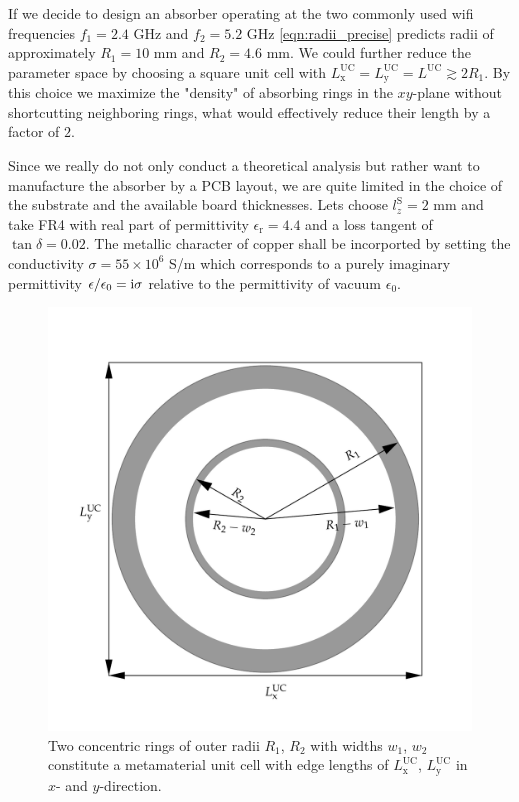 If we decide to design an absorber operating at the two commonly used wifi frequencies $f_1=2.4$ GHz and $f_2=5.2$ GHz \cref{eqn:radii_precise} predicts radii of approximately $R_1=10$ mm and $R_2=4.6$ mm. We could further reduce the parameter space by choosing a square unit cell with $L^\mathrm{UC}_\mathrm{x}=L^\mathrm{UC}_\mathrm{y}=L^\mathrm{UC}\gtrsim 2R_1$. By this choice we maximize the "density" of absorbing rings in the $xy$-plane without shortcutting neighboring rings, what would effectively reduce their length by a factor of $2$.

Since we really do not only conduct a theoretical analysis but rather want to manufacture the absorber by a PCB layout, we are quite limited in the choice of the substrate and the available board thicknesses. Lets choose $l_z^\mathrm{S}=2$ mm and take FR4 with real part of permittivity $\epsilon_\mathrm{r}=4.4$ and a loss tangent of $\tan \delta=0.02$. The metallic character of copper shall be incorported by setting the conductivity $\sigma=55\times 10^6$ S/m which corresponds to a purely imaginary permittivity $\epsilon/\epsilon_0 = \mathrm{i} \sigma$ relative to the permittivity of vacuum $\epsilon_0$.

\begin{figure}
\centering
\includegraphics[width=0.75\linewidth]{./media/double_ring_sketch.pdf}
\caption{Two concentric rings of outer radii $R_1$, $R_2$ with widths $w_1$, $w_2$ constitute a metamaterial unit cell with edge lengths of $L_\mathrm{x}^\mathrm{UC}$, $L_\mathrm{y}^\mathrm{UC}$ in $x$- and $y$-direction.}
\label{fig:double_ring_sketch}
\end{figure}

